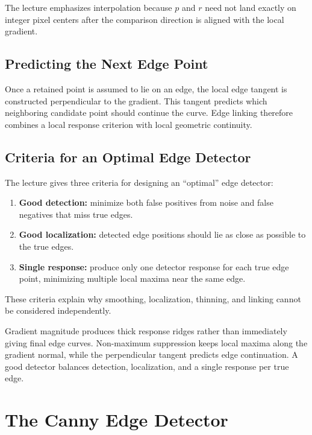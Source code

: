 \documentclass[11pt,a4paper,oneside]{report}
\begin{document}
The lecture emphasizes interpolation because $p$ and $r$ need not land exactly on integer pixel centers after the comparison direction is aligned with the local gradient.

\section{Predicting the Next Edge Point}

Once a retained point is assumed to lie on an edge, the local edge tangent is constructed perpendicular to the gradient. This tangent predicts which neighboring candidate point should continue the curve. Edge linking therefore combines a local response criterion with local geometric continuity.

\section{Criteria for an Optimal Edge Detector}

The lecture gives three criteria for designing an ``optimal'' edge detector:
\begin{enumerate}
  \item \textbf{Good detection:} minimize both false positives from noise and false negatives that miss true edges.
  \item \textbf{Good localization:} detected edge positions should lie as close as possible to the true edges.
  \item \textbf{Single response:} produce only one detector response for each true edge point, minimizing multiple local maxima near the same edge.
\end{enumerate}

These criteria explain why smoothing, localization, thinning, and linking cannot be considered independently.

\begin{chaptersummary}
Gradient magnitude produces thick response ridges rather than immediately giving final edge curves. Non-maximum suppression keeps local maxima along the gradient normal, while the perpendicular tangent predicts edge continuation. A good detector balances detection, localization, and a single response per true edge.
\end{chaptersummary}

\chapter{The Canny Edge Detector}
\end{document}
